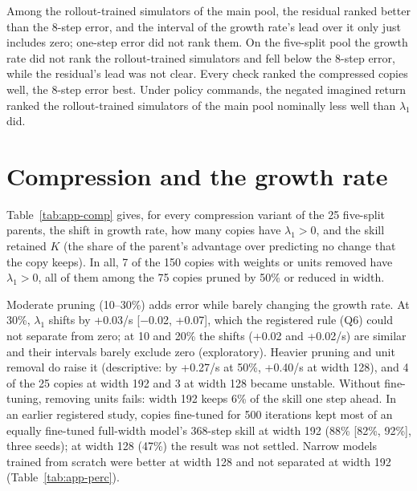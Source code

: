 Among the rollout-trained simulators of the main pool, the residual ranked better than the 8-step error, and the
interval of the growth rate's lead over it only just includes zero; one-step error did not rank them. On the five-split pool the
growth rate did not rank the rollout-trained simulators and fell below the 8-step error, while the residual's lead was
not clear. Every check ranked the compressed copies well, the 8-step error best. Under policy commands, the negated
imagined return ranked the rollout-trained simulators of the main pool nominally less well than $\lambda_1$ did.

\FloatBarrier
\section{Compression and the growth rate}\label{app:A5}
Table~\ref{tab:app-comp} gives, for every compression variant of the 25 five-split parents, the shift in
growth rate, how many copies have $\lambda_1>0$, and the skill retained $K$ (the share of the parent's advantage over
predicting no change that the copy keeps). In all, 7 of the 150 copies with
weights or units removed have $\lambda_1>0$, all of them among the 75 copies pruned by 50\% or reduced in
width.

Moderate pruning (10--30\%) adds error while barely changing the growth rate. At 30\%, $\lambda_1$ shifts by
+0.03/s [$-$0.02, +0.07], which the registered rule (Q6) could not separate from zero; at 10 and 20\%
the shifts (+0.02 and +0.02/s) are similar and their intervals barely exclude zero
(exploratory). Heavier pruning and unit removal do raise it (descriptive: by +0.27/s at 50\%,
+0.40/s at width 128), and 4 of the 25 copies at width 192 and 3
at width 128 became unstable. Without fine-tuning, removing units fails: width 192 keeps 6\% of the skill
one step ahead. In an earlier registered study, copies fine-tuned for 500 iterations kept most of an equally
fine-tuned full-width model's 368-step skill at width 192 (88\% [82\%, 92\%],
three seeds); at width 128 (47\%) the result was not settled. Narrow models trained from scratch
were better at width 128 and not separated at width 192 (Table~\ref{tab:app-perc}).

